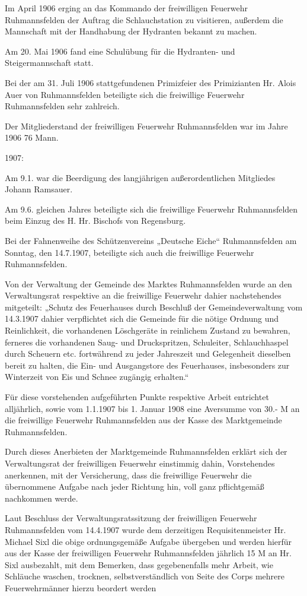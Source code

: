 Im April 1906 erging an das Kommando der freiwilligen Feuerwehr Ruhmannsfelden
der Auftrag die Schlauchstation zu visitieren, außerdem die Mannschaft mit der
Handhabung der Hydranten bekannt zu machen.

Am 20. Mai 1906 fand eine Schulübung für die Hydranten- und Steigermannschaft
statt.

Bei der am 31. Juli 1906 stattgefundenen Primizfeier des Primizianten Hr. Alois
Auer von Ruhmannsfelden beteiligte sich die freiwillige Feuerwehr Ruhmannsfelden
sehr zahlreich.

Der Mitgliederstand der freiwilligen Feuerwehr Ruhmannsfelden war im Jahre 1906
76 Mann.

1907:

Am 9.1. war die Beerdigung des langjährigen außerordentlichen Mitgliedes Johann
Ramsauer.

Am 9.6. gleichen Jahres beteiligte sich die freiwillige Feuerwehr Ruhmannsfelden
beim Einzug des H. Hr. Bischofs von Regensburg.

Bei der Fahnenweihe des Schützenvereins „Deutsche Eiche“ Ruhmannsfelden am
Sonntag, den 14.7.1907, beteiligte sich auch die freiwillige Feuerwehr
Ruhmannsfelden.

Von der Verwaltung der Gemeinde des Marktes Ruhmannsfelden wurde an den
Verwaltungsrat respektive an die freiwillige Feuerwehr dahier nachstehendes
mitgeteilt: „Schutz des Feuerhauses durch Beschluß der Gemeindeverwaltung vom
14.3.1907 dahier verpflichtet sich die Gemeinde für die nötige Ordnung und
Reinlichkeit, die vorhandenen Löschgeräte in reinlichem Zustand zu bewahren,
ferneres die vorhandenen Saug- und Druckspritzen, Schuleiter, Schlauchhaspel
durch Scheuern etc. fortwährend zu jeder Jahreszeit und Gelegenheit dieselben
bereit zu halten, die Ein- und Ausgangstore des Feuerhauses, insbesonders zur
Winterzeit von Eis und Schnee zugängig erhalten.“

Für diese vorstehenden aufgeführten Punkte respektive Arbeit entrichtet
alljährlich, sowie vom 1.1.1907 bis 1. Januar 1908 eine Aversumme von 30.- M an
die freiwillige Feuerwehr Ruhmannsfelden aus der Kasse des Marktgemeinde
Ruhmannsfelden.

Durch dieses Anerbieten der Marktgemeinde Ruhmannsfelden erklärt sich der
Verwaltungsrat der freiwilligen Feuerwehr einstimmig dahin, Vorstehendes
anerkennen, mit der Versicherung, dass die freiwillige Feuerwehr die übernommene
Aufgabe nach jeder Richtung hin, voll ganz pflichtgemäß nachkommen werde.

Laut Beschluss der Verwaltungsratssitzung der freiwilligen Feuerwehr
Ruhmannsfelden vom 14.4.1907 wurde dem derzeitigen Requisitenmeister Hr. Michael
Sixl die obige ordnungsgemäße Aufgabe übergeben und werden hierfür aus der Kasse
der freiwilligen Feuerwehr Ruhmannsfelden jährlich 15 M an Hr. Sixl ausbezahlt,
mit dem Bemerken, dass gegebenenfalls mehr Arbeit, wie Schläuche waschen,
trocknen, selbstverständlich von Seite des Corps mehrere Feuerwehrmänner hierzu
beordert werden

